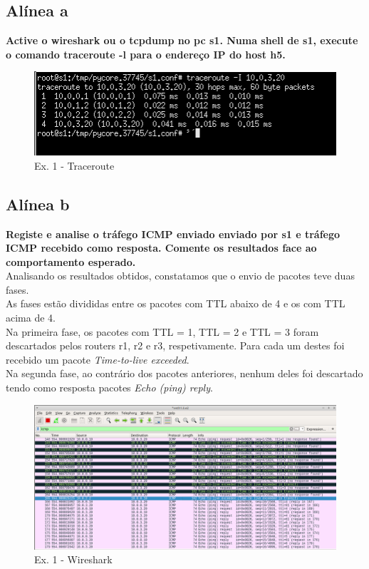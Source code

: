 \documentclass[a4paper]{report}
\begin{document}
\subsection{Alínea a}
\textbf{Active o wireshark ou o tcpdump no pc s1. Numa shell de s1, execute o
comando traceroute -l para o endereço IP do host h5.}

\begin{figure}[H]
    \centering 
    \includegraphics[width=\textwidth]{images/traceroutEx1.png}  
    \caption{Ex. 1 - Traceroute}
    \label{fig:traceroutEx1}
\end{figure}
\subsection{Alínea b}
\textbf{Registe e analise o tráfego ICMP enviado enviado por s1 e tráfego ICMP
recebido como resposta. Comente os resultados face ao comportamento esperado.}\\
Analisando os resultados obtidos, constatamos que o envio de pacotes teve duas
fases.\\
As fases estão divididas entre os pacotes com TTL abaixo de 4 e os com TTL acima
de 4.\\
Na primeira fase, os pacotes com TTL = 1, TTL = 2 e TTL = 3 foram descartados
pelos routers r1, r2 e r3, respetivamente. Para cada um destes foi recebido um
pacote \textit{Time-to-live exceeded}.\\
Na segunda fase, ao contrário dos pacotes anteriores, nenhum deles foi
descartado tendo como resposta pacotes \textit{Echo (ping) reply}.

\begin{figure}[H]
    \centering 
    \includegraphics[width=\textwidth]{images/wiresharkEx1.png}  
    \caption{Ex. 1 - Wireshark}
    \label{fig:wiresharkEx1}
\end{figure}
\end{document}
